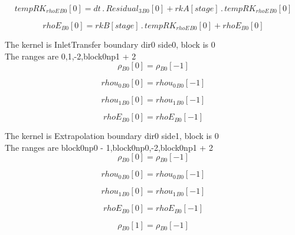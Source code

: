 \documentclass{article}
\begin{document}
\begin{dmath}{tempRK_{rhoE}{_{B0}}}[{0}] = dt \,.\, {Residual_{3}{_{B0}}}[{0}] + {rkA}[{stage}] \,.\, {tempRK_{rhoE}{_{B0}}}[{0}]\end{dmath}

\begin{dmath}{rhoE{_{B0}}}[{0}] = {rkB}[{stage}] \,.\, {tempRK_{rhoE}{_{B0}}}[{0}] + {rhoE{_{B0}}}[{0}]\end{dmath}

\noindent The kernel is InletTransfer boundary dir0 side0, block is 0\\\noindent The ranges are 0,1,-2,block0np1 + 2\\\begin{dmath}{\rho{_{B0}}}[{0}] = {\rho{_{B0}}}[{-1}]\end{dmath}

\begin{dmath}{rhou_{0}{_{B0}}}[{0}] = {rhou_{0}{_{B0}}}[{-1}]\end{dmath}

\begin{dmath}{rhou_{1}{_{B0}}}[{0}] = {rhou_{1}{_{B0}}}[{-1}]\end{dmath}

\begin{dmath}{rhoE{_{B0}}}[{0}] = {rhoE{_{B0}}}[{-1}]\end{dmath}

\noindent The kernel is Extrapolation boundary dir0 side1, block is 0\\\noindent The ranges are block0np0 - 1,block0np0,-2,block0np1 + 2\\\begin{dmath}{\rho{_{B0}}}[{0}] = {\rho{_{B0}}}[{-1}]\end{dmath}

\begin{dmath}{rhou_{0}{_{B0}}}[{0}] = {rhou_{0}{_{B0}}}[{-1}]\end{dmath}

\begin{dmath}{rhou_{1}{_{B0}}}[{0}] = {rhou_{1}{_{B0}}}[{-1}]\end{dmath}

\begin{dmath}{rhoE{_{B0}}}[{0}] = {rhoE{_{B0}}}[{-1}]\end{dmath}

\begin{dmath}{\rho{_{B0}}}[{1}] = {\rho{_{B0}}}[{-1}]\end{dmath}
\end{document}

